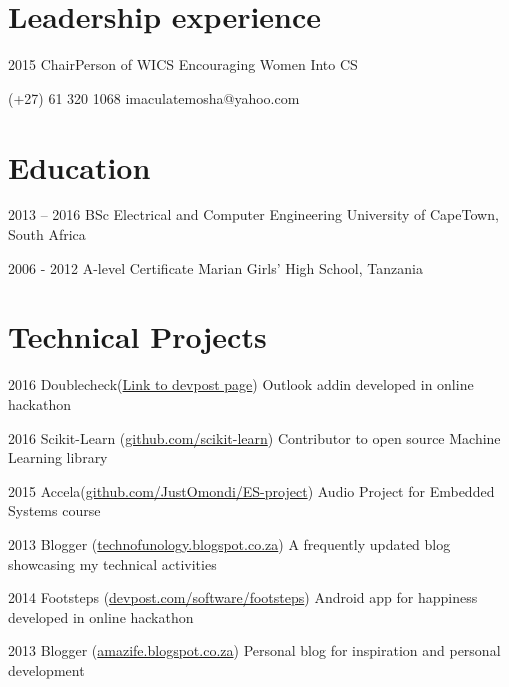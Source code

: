 \documentclass[fontsize=9pt]{tccv}
\begin{document}
\section{Leadership experience}

\begin{yearlist}
{2015}
{ChairPerson of WICS}
{Encouraging Women Into CS}
\end{yearlist}
    {(+27) 61 320 1068}
    {imaculatemosha@yahoo.com}

\section{Education}

\begin{yearlist}

\item{2013 -- 2016}
     {BSc Electrical and Computer Engineering}
     {University of CapeTown, South Africa}

\item{2006 - 2012}
     {A-level Certificate}
     {Marian Girls' High School, Tanzania}

\end{yearlist}

\section{Technical Projects}

\begin{yearlist}

\item{2016}
     {Doublecheck(\href{http://devpost.com/software/doublecheck}{Link to devpost page})}
     {Outlook addin developed in online hackathon}

\item{2016}
     {Scikit-Learn (\href{https://github.com/imaculate/scikit-learn}{github.com/scikit-learn})}
     {Contributor to open source Machine Learning library}

\item{2015}
     {Accela(\href{https://github.com/JustOmondi/ES-project}{github.com/JustOmondi/ES-project})}
     {Audio Project for Embedded Systems course}

\item{2013}
     {Blogger (\href{http://technofunology.blogspot.co.za/}{technofunology.blogspot.co.za})}
     {A frequently updated blog showcasing my technical activities}

\item{2014}
{Footsteps (\href{http://devpost.com/software/footsteps}{devpost.com/software/footsteps})}
{Android app for happiness developed in online hackathon}

\item{2013}
     {Blogger (\href{http://amazife.blogspot.co.za/}{amazife.blogspot.co.za})}
     {Personal blog for inspiration and personal development}

\end{yearlist}
\end{document}

